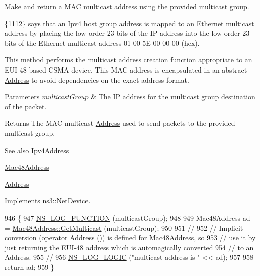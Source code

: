 Make and return a M\+AC multicast address using the provided multicast group. 

\{1112\} says that an \hyperlink{classns3_1_1Ipv4}{Ipv4} host group address is mapped to an Ethernet multicast address by placing the low-\/order 23-\/bits of the IP address into the low-\/order 23 bits of the Ethernet multicast address 01-\/00-\/5\+E-\/00-\/00-\/00 (hex).

This method performs the multicast address creation function appropriate to an E\+U\+I-\/48-\/based C\+S\+MA device. This M\+AC address is encapsulated in an abstract \hyperlink{classns3_1_1Address}{Address} to avoid dependencies on the exact address format.


\begin{DoxyParams}{Parameters}
{\em multicast\+Group} & The IP address for the multicast group destination of the packet. \\
\hline
\end{DoxyParams}
\begin{DoxyReturn}{Returns}
The M\+AC multicast \hyperlink{classns3_1_1Address}{Address} used to send packets to the provided multicast group.
\end{DoxyReturn}
\begin{DoxySeeAlso}{See also}
\hyperlink{classns3_1_1Ipv4Address}{Ipv4\+Address} 

\hyperlink{classns3_1_1Mac48Address}{Mac48\+Address} 

\hyperlink{classns3_1_1Address}{Address} 
\end{DoxySeeAlso}


Implements \hyperlink{classns3_1_1NetDevice_a98aa4852df367b6a393c8cc1d88af0d9}{ns3\+::\+Net\+Device}.


\begin{DoxyCode}
946 \{
947   \hyperlink{log-macros-disabled_8h_a90b90d5bad1f39cb1b64923ea94c0761}{NS\_LOG\_FUNCTION} (multicastGroup);
948 
949   Mac48Address ad = \hyperlink{classns3_1_1Mac48Address_a23d170f8c7a7d90a8110425620285819}{Mac48Address::GetMulticast} (multicastGroup);
950 
951   \textcolor{comment}{//}
952   \textcolor{comment}{// Implicit conversion (operator Address ()) is defined for Mac48Address, so}
953   \textcolor{comment}{// use it by just returning the EUI-48 address which is automagically converted}
954   \textcolor{comment}{// to an Address.}
955   \textcolor{comment}{//}
956   \hyperlink{group__logging_ga88acd260151caf2db9c0fc84997f45ce}{NS\_LOG\_LOGIC} (\textcolor{stringliteral}{"multicast address is "} << ad);
957 
958   \textcolor{keywordflow}{return} ad;
959 \}
\end{DoxyCode}


